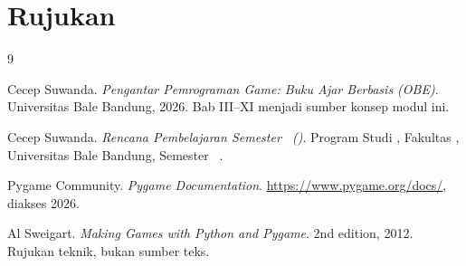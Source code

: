 
\clearpage
{}
{}
\section*{Rujukan}

\begin{thebibliography}{9}
\setlength{\itemsep}{0.35em}

Cecep Suwanda. \emph{Pengantar Pemrograman Game: Buku Ajar Berbasis
 (OBE)}. Universitas Bale Bandung, 2026.
Bab III--XI menjadi sumber konsep modul ini.

Cecep Suwanda. \emph{Rencana Pembelajaran Semester \NamaMK\ (\KodeMK)}.
Program Studi \NamaProdi, Fakultas \NamaFakultas, Universitas Bale Bandung,
Semester \SemesterMK\ \TahunAkademik.

Pygame Community. \emph{Pygame Documentation}. \url{https://www.pygame.org/docs/},
diakses 2026.

Al Sweigart. \emph{Making Games with Python and Pygame}. 2nd edition,
2012. Rujukan teknik, bukan sumber teks.

\end{thebibliography}
